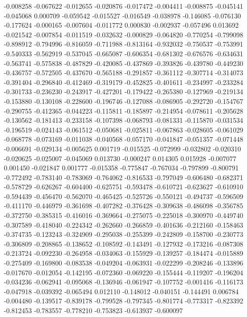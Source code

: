 -0.008258
-0.067622
-0.012655
-0.020876
-0.017472
-0.004411
-0.008875
-0.045141
-0.045068
0.000709
-0.059542
-0.015527
-0.016549
-0.038978
-0.146085
-0.076130
-0.177624
-0.000165
-0.007604
-0.011772
0.000830
-0.002937
-0.057496
0.013692
-0.021542
-0.007854
-0.011519
-0.032632
-0.000829
-0.064820
-0.770254
-0.799098
-0.898912
-0.794996
-0.816059
-0.711988
-0.813164
-0.932032
-0.750537
-0.753991
-0.540333
-0.562919
-0.537045
-0.665087
-0.606354
-0.681302
-0.676576
-0.634631
-0.563741
-0.575838
-0.487829
-0.420085
-0.437869
-0.393826
-0.439780
-0.449230
-0.436757
-0.572505
-0.437670
-0.565188
-0.291857
-0.361112
-0.307714
-0.314073
-0.391404
-0.296840
-0.412469
-0.319179
-0.452825
-0.401611
-0.234997
-0.233284
-0.301733
-0.236230
-0.243917
-0.427201
-0.179422
-0.265380
-0.127969
-0.219134
-0.153880
-0.130108
-0.228600
-0.196746
-0.127088
-0.086905
-0.292720
-0.154767
-0.290755
-0.412365
-0.044223
-0.115811
-0.185897
-0.214954
-0.078611
-0.205628
-0.130562
-0.181413
-0.233158
-0.107398
-0.068793
-0.081331
-0.115870
-0.031534
-0.196519
-0.024143
-0.061512
-0.050681
-0.025811
-0.067863
-0.028605
-0.061029
-0.068778
-0.073169
-0.011038
-0.040568
-0.057170
-0.041847
-0.051357
-0.071448
-0.006691
-0.029134
-0.005625
0.001719
-0.015525
-0.072999
-0.032802
-0.020310
-0.020625
-0.025007
-0.045069
0.013730
-0.000247
0.014305
0.015928
-0.007077
0.001450
-0.021847
0.001777
-0.015358
-0.775847
-0.767034
-0.797899
-0.800791
-0.772492
-0.783140
-0.783069
-0.764062
-0.816533
-0.797049
-0.606480
-0.682371
-0.578729
-0.626267
-0.604400
-0.625751
-0.593478
-0.610721
-0.623627
-0.610910
-0.594439
-0.456470
-0.562070
-0.465425
-0.525726
-0.550121
-0.494737
-0.596509
-0.411170
-0.446979
-0.361698
-0.407282
-0.376428
-0.309638
-0.486098
-0.356785
-0.372750
-0.385315
-0.416016
-0.369664
-0.275075
-0.225018
-0.300970
-0.449740
-0.307589
-0.418040
-0.224342
-0.262660
-0.266859
-0.401636
-0.212160
-0.158463
-0.374735
-0.123243
-0.324909
-0.295038
-0.255399
-0.242809
-0.158700
-0.230773
-0.306809
-0.208865
-0.138652
-0.108592
-0.143491
-0.127932
-0.173216
-0.087308
-0.213724
-0.092230
-0.264958
-0.034063
-0.155929
-0.139257
-0.184474
-0.015889
-0.275409
-0.169800
-0.083538
-0.049204
-0.063931
-0.022299
-0.208246
-0.133896
-0.017670
-0.012054
-0.142195
-0.072360
-0.069220
-0.155444
-0.119207
-0.196204
-0.034236
-0.062941
-0.095068
-0.136946
-0.061947
-0.107752
-0.001416
-0.116173
-0.047918
-0.039392
-0.065494
0.012110
-0.148012
-0.040151
-0.144491
0.006784
-0.004480
-0.139517
-0.839178
-0.799528
-0.797345
-0.801774
-0.773317
-0.823392
-0.812453
-0.783557
-0.778210
-0.753823
-0.613937
-0.600097
